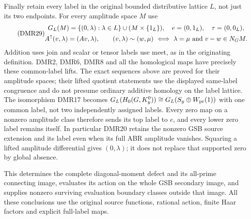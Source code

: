 Finally retain every label in the original bounded distributive
lattice $L$, not just its two endpoints. For every amplitude
space $M$ use
\begin{equation}\tag{DMR29}
\begin{gathered}
G_L(M)=\{(0,\lambda):\lambda\in L\}
                       \cup(M\times\{1_L\}),\quad
e=(0,1_L),\quad\tau=(0,0_L),\\
A^\uparrow(v,\lambda)=(Av,\lambda),\qquad
(v,\lambda)\sim(w,\mu)
 \ \Longleftrightarrow\ \lambda=\mu\ \hbox{and}\ v-w\in N_GM.
\end{gathered}
\end{equation}
Addition uses join and scalar or tensor labels use meet, as in
the originating definition. DMR2, DMR6, DMR8 and all the
homological maps have precisely these common-label lifts.
The exact sequences above are proved for their amplitude
spaces; their lifted quotient statements use the displayed
same-label congruence and do not presume ordinary additive
homology on the label lattice. The isomorphism DMR17 becomes
$G_L(H_0(G,K_y^0))\cong G_L(S_y\oplus W_{\rm pr}(1))$
with one common label, not two independently assigned labels.
Every zero map on a nonzero amplitude class therefore sends
its top label to $e$, and every lower zero label remains itself.
In particular DMR20 retains the nonzero GSB source extension
and its label even when its full ABR amplitude vanishes.
Squaring a lifted amplitude differential gives $(0,\lambda)$;
it does not replace that supported zero by global absence.

This determines the complete diagonal-moment defect and its
all-prime connecting image, evaluates its action on the whole
GSB secondary image, and supplies nonzero surviving evaluation
boundary classes outside that image. All these conclusions
use the original source functions, rational action, finite
Haar factors and explicit full-label maps.
